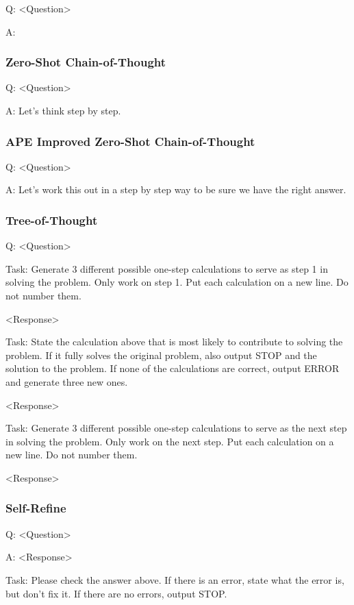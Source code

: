 \documentclass[11pt]{article}
\begin{document}
Q: <Question>

A:

\subsubsection*{Zero-Shot Chain-of-Thought}

Q: <Question>

A: Let's think step by step.

\subsubsection*{APE Improved Zero-Shot Chain-of-Thought}

Q: <Question>

A: Let's work this out in a step by step way to be sure we have the right answer.

\subsubsection*{Tree-of-Thought}

Q: <Question>

Task: Generate 3 different possible one-step calculations to serve as step 1 in solving the problem. Only work on step 1. Put each calculation on a new line. Do not number them.

<Response>

Task: State the calculation above that is most likely to contribute to solving the problem. If it fully solves the original problem, also output STOP and the solution to the problem. If none of the calculations are correct, output ERROR and generate three new ones.

<Response>

Task: Generate 3 different possible one-step calculations to serve as the next step in solving the problem. Only work on the next step. Put each calculation on a new line. Do not number them.

<Response>

\subsubsection*{Self-Refine}

Q: <Question>

A: <Response>

Task: Please check the answer above. If there is an error, state what the error is, but don't fix it. If there are no errors, output STOP.
\end{document}

